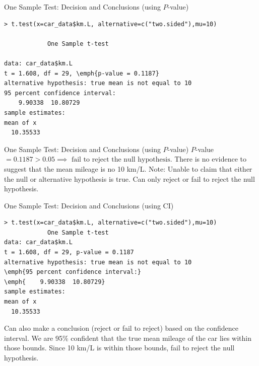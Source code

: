 \documentclass[xcolor=svgnames, 10pt, handout]{beamer}
\begin{document}
\begin{frame}[fragile]{One Sample Test: Decision and Conclusions (using $P$-value)}
\begin{Verbatim}[xleftmargin=2em, xrightmargin=1.5em, frame=single, label=R code, framesep=0.5em, fontsize=\small, commandchars=\\\{\}]
> t.test(x=car_data$km.L, alternative=c("two.sided"),mu=10)
            
            One Sample t-test
            
data: car_data$km.L
t = 1.608, df = 29, \emph{p-value = 0.1187}
alternative hypothesis: true mean is not equal to 10
95 percent confidence interval:
    9.90338  10.80729
sample estimates:
mean of x
  10.35533
\end{Verbatim}
\end{frame}


\begin{frame}[fragile]{One Sample Test: Decision and Conclusions (using $P$-value)}
\vfill
$P$-value $=0.1187 > 0.05 \implies \text{ fail to reject the null hypothesis}$.
\vfill
There is no evidence to suggest that the mean mileage is no 10 km/L.
\vfill
Note: Unable to claim that either the null or alternative hypothesis is true.  Can only reject or fail to reject the null hypothesis.
\vfill
\end{frame}


\begin{frame}[fragile]{One Sample Test: Decision and Conclusions (using CI)}\small
\begin{Verbatim}[xleftmargin=2em, xrightmargin=1.5em, frame=single, label=R code, framesep=0.5em, fontsize=\footnotesize, commandchars=\\\{\}]
> t.test(x=car_data$km.L, alternative=c("two.sided"),mu=10)
            One Sample t-test
data: car_data$km.L
t = 1.608, df = 29, p-value = 0.1187
alternative hypothesis: true mean is not equal to 10
\emph{95 percent confidence interval:}
\emph{    9.90338  10.80729}
sample estimates:
mean of x
  10.35533
\end{Verbatim}
Can also make a conclusion (reject or fail to reject) based on the confidence interval. We are 95\% confident that the true mean mileage of the car lies within those bounds. 
\vfill
Since 10 km/L is within those bounds, fail to reject the null hypothesis.
\vfill
\end{frame}
\end{document}
